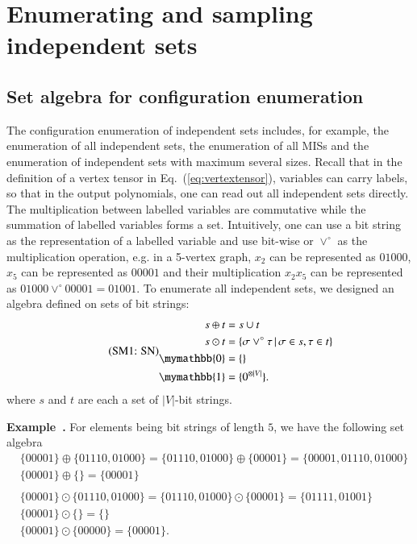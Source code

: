 \documentclass[onefignum, onetabnum]{siamart190516}
\newcommand{\eqname}[1]{\stepcounter{equation}\tag{\theequation : #1}}
\newcommand{\<}{\langle}
\renewcommand{\>}{\rangle}
\newcommand{\Eq}[1]{Eq.~(\ref{#1})}
\newcounter{example}
\newenvironment{example}[1][]{\refstepcounter{example}\par\medskip
   \noindent \textbf{Example~\theexample. #1} \rmfamily}{\medskip}
\begin{document}
\section{Enumerating and sampling independent sets}\label{sec:enumeration}

\subsection{Set algebra for configuration enumeration}
The configuration enumeration of independent sets includes,
for example, the enumeration of all independent sets, the enumeration of all MISs and the enumeration of independent sets with maximum several sizes.
Recall that in the definition of a vertex tensor in \Eq{eq:vertextensor}, variables can carry labels, so that in the output polynomials, one can read out all independent sets directly.
The multiplication between labelled variables are commutative while the summation of labelled variables forms a set.
Intuitively, one can use a bit string as the representation of a labelled variable and use bit-wise or $\lor^\circ$ as the multiplication operation,
e.g. in a 5-vertex graph, $x_2$ can be represented as $01000$, $x_5$ can be represented as $00001$ and their multiplication $x_2x_5$ can be represented as $01000 \lor^\circ 00001 = 01001$.
To enumerate all independent sets, we designed an algebra defined on sets of bit strings:
\begin{equation}
\eqname{SN}
\begin{split}
    s \oplus t &= s \cup t\\
    s \odot t &= \{\sigma \lor^\circ \tau \, | \, \sigma \in s, \tau \in t\}\\
    \mymathbb{0} &= \{\}\\
    \mymathbb{1} &= \{0^{\otimes |V|}\}.
\end{split}\label{eq:set}
\end{equation}
where $s$ and $t$ are each a set of $|V|$-bit strings.
\begin{example}\label{eg:setalgebra}
    For elements being bit strings of length $5$, we have the following set algebra
\begin{equation*}
\begin{split}
    &\{00001\} \oplus \{01110, 01000\} = \{01110, 01000\} \oplus \{00001\} = \{00001,01110, 01000\}\\
    &\{00001\} \oplus \{\} = \{00001\}\\
&\\
    &\{00001\} \odot \{01110, 01000\} = \{01110, 01000\} \odot \{00001\} = \{01111, 01001\}\\
    &\{00001\} \odot \{\} = \{\}\\
    &\{00001\} \odot \{00000\} = \{00001\}.
\end{split}
\end{equation*}
\end{example}
\end{document}
